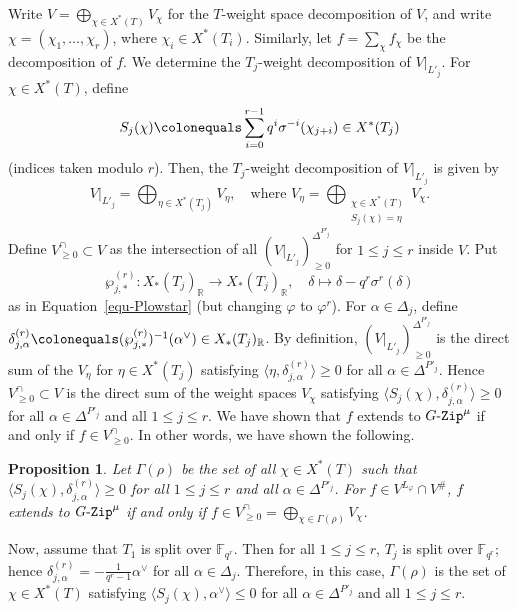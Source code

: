 \documentclass[11pt]{amsart}
\numberwithin{equation}{section}
\newtheorem{proposition}[theorem]{Proposition}
\theoremstyle{definition}
\theoremstyle{remark}
\newcommand{\GZip}{\mathop{\text{$G$-{\tt Zip}}}\nolimits}
\newcommand{\FF}{\mathbb{F}}
\newcommand{\RR}{\mathbb{R}}
\newcommand{\lra}{\longrightarrow}
\begin{document}
Write $V=\bigoplus_{\chi\in X^*(T)} V_\chi$ for the $T$-weight space decomposition of $V$, and write $\chi=(\chi_1, \dots , \chi_r)$, where $\chi_i \in X^*(T_i)$. Similarly, let $f=\sum_{\chi} f_\chi$ be the decomposition of $f$. We determine the $T_j$-weight decomposition of $V|_{L'_j}$. For $\chi \in X^*(T)$, define 
\[S_j(\chi)\colonequals \sum_{i=0}^{r-1} q^i \sigma^{-i}(\chi_{j+i}) \in X^*(T_j)\]
(indices taken modulo $r$). Then, the $T_j$-weight decomposition of $V|_{L'_j}$ is given by
\begin{equation}
    V|_{L'_j} = \bigoplus_{\eta \in X^*(T_j)} V_\eta, \quad \textrm{where }  V_\eta = \bigoplus_{\substack{ \chi \in X^*(T) \\ S_j(\chi)=\eta }} V_\chi.
\end{equation}
Define $V^{\cap}_{\geq 0}\subset V$ as the intersection of all $\left( V|_{L'_j} \right)^{\Delta^{P'_j}}_{\geq 0}$ for $1\leq j \leq r$ inside $V$. Put
\begin{equation}
 \wp^{(r)}_{j,*} \colon X_*(T_j)_\RR \lra X_*(T_j)_\RR, \quad \delta \longmapsto \delta-q^r\sigma^{r}(\delta)
\end{equation}
as in Equation~\eqref{equ-Plowstar} (but changing $\varphi$ to $\varphi^r$). For $\alpha \in \Delta_j$, define $\delta^{(r)}_{j,\alpha}\colonequals(\wp^{(r)}_{j,*})^{-1}(\alpha^\vee)\in X_*(T_j)_{\RR}$. By definition, $( V|_{L'_j})^{\Delta^{P'_j}}_{\geq 0}$ is the direct sum of the $V_{\eta}$ for $\eta\in X^*(T_j)$ satisfying $\langle \eta, \delta^{(r)}_{j,\alpha} \rangle\geq 0$ for all $\alpha \in \Delta^{P'_j}$. Hence $V^{\cap}_{\geq 0}\subset V$ is the direct sum of the weight spaces $V_\chi$ satisfying $\langle S_j(\chi), \delta^{(r)}_{j,\alpha} \rangle \geq 0$ for all $\alpha \in \Delta^{P'_j}$ and all $1\leq j \leq r$. We have shown that $f$ extends to $\GZip^\mu$ if and only if $f\in V^{\cap}_{\geq 0}$. In other words, we have  shown the following. 

\begin{proposition} \label{glob-sec-Weil}
Let $\Gamma(\rho)$ be the set of all $\chi \in X^*(T)$ such that $\langle S_j(\chi), \delta^{(r)}_{j,\alpha} \rangle \geq 0 $ for all $1\leq j\leq r$ and all $\alpha\in \Delta^{P'_j}$. For $f\in V^{L_\varphi}\cap V^{\#}$, $f$ extends to $\GZip^\mu$ if and only if $f\in V^{\cap}_{\geq 0}=\bigoplus_{\chi\in \Gamma(\rho)} V_\chi$.
\end{proposition}

Now, assume that $T_1$ is split over $\FF_{q^r}$. 
Then for all $1\leq j \leq r$, $T_j$ is split over $\FF_{q^r}$; hence $\delta^{(r)}_{j,\alpha} = -\frac{1}{q^r-1} \alpha^\vee$ for all $\alpha \in \Delta_j$. Therefore, in this case, $\Gamma(\rho)$ is the set of $\chi\in X^*(T)$ satisfying $\langle S_j(\chi), \alpha^\vee \rangle \leq 0$ for all $\alpha \in \Delta^{P'_j}$ and all $1\leq j \leq r$.
\end{document}
